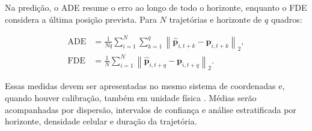Na predição, o \ac{ADE} resume o erro ao longo de todo o horizonte, enquanto o \ac{FDE} considera a última posição prevista. Para $N$ trajetórias e horizonte de $q$ quadros:

\begin{align}
	\operatorname{ADE} &=
	\frac{1}{Nq}\sum_{i=1}^{N}\sum_{k=1}^{q}
	\left\lVert\widehat{\mathbf{p}}_{i,t+k}-\mathbf{p}_{i,t+k}\right\rVert_2,\\
	\operatorname{FDE} &=
	\frac{1}{N}\sum_{i=1}^{N}
	\left\lVert\widehat{\mathbf{p}}_{i,t+q}-\mathbf{p}_{i,t+q}\right\rVert_2.
\end{align}

Essas medidas devem ser apresentadas no mesmo sistema de coordenadas e, quando houver calibração, também em unidade física \cite{alahi2016sociallstm}. Médias serão acompanhadas por dispersão, intervalos de confiança e análise estratificada por horizonte, densidade celular e duração da trajetória.
